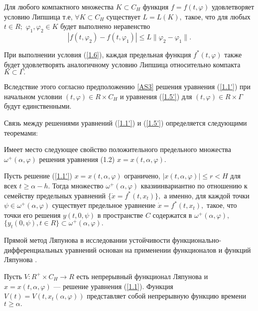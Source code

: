 	\begin{definition}\label{AS3} Для любого компактного множества $K\subset C_H$
		функция $f=f(t,\varphi )$ удовлетворяет условию Липшица т.е, $\forall K\subset C_H$ существует $L=L(K),$ такое, что  для любых
		$t\in R;$ $\varphi _1, \varphi _2\in K$ будет выполнено неравенство
		\begin{equation}
		|f(t,\varphi _2)-f(t,\varphi _1)|\le L\|\varphi _2-\varphi _1\|.
		\label{1.6}
		\end{equation}
	\end{definition}
	
	При выполнении условия (\ref{1.6}), каждая
	предельная функция $f^*(t,\varphi )$ также будет удовлетворять
	аналогичному условию Липшица относительно компакта
	$K\subset\Gamma.$
	
	Вследствие этого согласно предположению  \ref{AS3}
	решения
	уравнения (\ref{1.1'}) при начальном условии $(t,\varphi )\in R 
	\times C_H$ и уравнения (\ref{1.5'}) для $(t,\varphi )\in R
	\times\Gamma $ будут единственными.
	
	Связь между решениями уравнений  (\ref{1.1'})  и  (\ref{1.5'})
	определяется следующими теоремами:
	
	Имеет место следующее свойство положительного предельного множества $\omega^{+} (\alpha, \varphi)$ решения уравнения (1.2) $x = x(t, \alpha, \varphi).$
	
	\begin{theorem}\label{t-1.2}  Пусть  решение  (\ref{1.1'}) $x=x(t,\alpha ,\varphi )$
		ограничено, $|x(t,\alpha ,\varphi)|\le r<H$ для всех $t\ge \alpha
		-h.$ Тогда множество $\omega ^+(\alpha ,\varphi )$
		квазиинвариантно по отношению к семейству предельных уравнений
		$\{\dot x=f^*(t,x_t)\},$ а именно,  для  каждой точки $\psi\in\omega
		^+(\alpha ,\varphi )$ существует предельное уравнение $\dot
		x=f^*(t,x_t),$ такое, что точки его решения
		$y(t,0,\psi )$ в пространстве $C$ содержатся в $\omega^+(\alpha,\varphi ),$
		$\{ y_t(0,\psi ), t\in R\}\subset\omega ^+(\alpha ,\varphi ).$
	\end{theorem}
	
	Прямой метод Ляпунова в исследовании устойчивости функ\-ци\-о\-наль\-но-диф\-фе\-рен\-ци\-аль\-ных
	уравнений основан на применении функционалов и функций Ляпунова \cite{}.
	
	Пусть $V:R^+\times C_H\to R$ есть непрерывный функционал Ляпунова и
	$x=x(t,\alpha ,\varphi )$ ---
	решение уравнения (\ref{1.1}). Функция $V(t)=V(t,x_t(\alpha
	,\varphi ))$ представляет собой непрерывную функцию времени
	$t\ge\alpha.$
	
